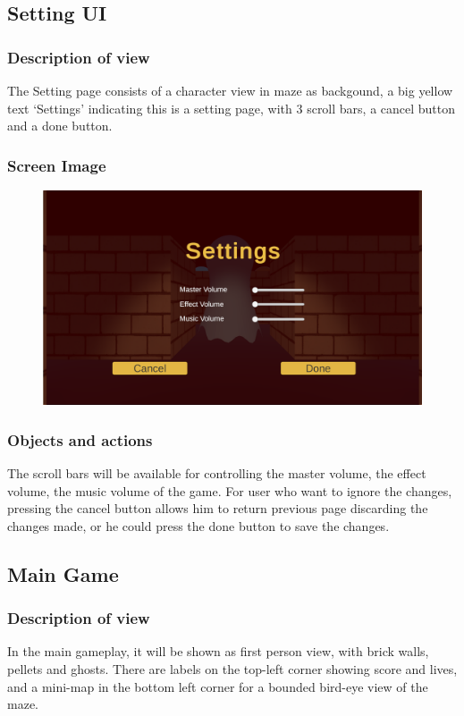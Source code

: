 \documentclass[11pt]{article}
\begin{document}
\subsection{Setting UI}
\subsubsection{Description of view}
The Setting page consists of a character view in maze as backgound, a big yellow text `Settings' indicating this is a setting page, with 3 scroll bars, a cancel button and a done button.
\subsubsection{Screen Image}
\begin{figure}[H]
    \centering
    \includegraphics*[scale=0.2]{UI1.1Settings.png}
\end{figure}
\subsubsection{Objects and actions}
The scroll bars will be available for controlling the master volume, the effect volume, the music volume of the game. For user who want to ignore the changes, pressing the cancel button allows him to return previous page discarding the changes made, or he could press the done button to save the changes.

\subsection{Main Game}
\subsubsection{Description of view}
In the main gameplay, it will be shown as first person view, with brick walls, pellets and ghosts. There are labels on the top-left corner showing score and lives, and a mini-map in the bottom left corner for a bounded bird-eye view of the maze. 
\end{document}
